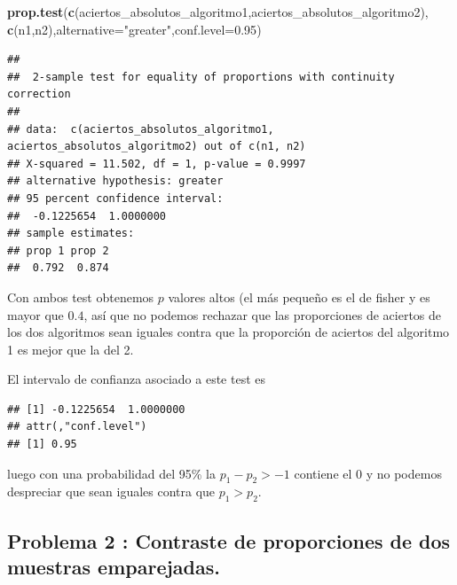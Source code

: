 \documentclass[
]{article}
\newenvironment{Shaded}{\begin{snugshade}}{\end{snugshade}}
\newcommand{\DataTypeTok}[1]{\textcolor[rgb]{0.13,0.29,0.53}{#1}}
\newcommand{\FloatTok}[1]{\textcolor[rgb]{0.00,0.00,0.81}{#1}}
\newcommand{\KeywordTok}[1]{\textcolor[rgb]{0.13,0.29,0.53}{\textbf{#1}}}
\newcommand{\NormalTok}[1]{#1}
\newcommand{\OperatorTok}[1]{\textcolor[rgb]{0.81,0.36,0.00}{\textbf{#1}}}
\newcommand{\StringTok}[1]{\textcolor[rgb]{0.31,0.60,0.02}{#1}}
\begin{document}
\begin{Shaded}
\begin{Highlighting}[]
\KeywordTok{prop.test}\NormalTok{(}\KeywordTok{c}\NormalTok{(aciertos_absolutos_algoritmo1,aciertos_absolutos_algoritmo2), }\KeywordTok{c}\NormalTok{(n1,n2),}\DataTypeTok{alternative=}\StringTok{"greater"}\NormalTok{,}\DataTypeTok{conf.level=}\FloatTok{0.95}\NormalTok{)}
\end{Highlighting}
\end{Shaded}

\begin{verbatim}
## 
##  2-sample test for equality of proportions with continuity correction
## 
## data:  c(aciertos_absolutos_algoritmo1, aciertos_absolutos_algoritmo2) out of c(n1, n2)
## X-squared = 11.502, df = 1, p-value = 0.9997
## alternative hypothesis: greater
## 95 percent confidence interval:
##  -0.1225654  1.0000000
## sample estimates:
## prop 1 prop 2 
##  0.792  0.874
\end{verbatim}

Con ambos test obtenemos \(p\) valores altos (el más pequeño es el de
fisher y es mayor que \(0.4\), así que no podemos rechazar que las
proporciones de aciertos de los dos algoritmos sean iguales contra que
la proporción de aciertos del algoritmo 1 es mejor que la del 2.

El intervalo de confianza asociado a este test es

\begin{Shaded}
\end{Shaded}

\begin{verbatim}
## [1] -0.1225654  1.0000000
## attr(,"conf.level")
## [1] 0.95
\end{verbatim}

luego con una probabilidad del 95\% la \(p_1-p_2> -1\) contiene el 0 y
no podemos despreciar que sean iguales contra que \(p_1>p_2.\)

\hypertarget{problema-2-contraste-de-proporciones-de-dos-muestras-emparejadas.}{%
\subsection{Problema 2 : Contraste de proporciones de dos muestras
emparejadas.}\label{problema-2-contraste-de-proporciones-de-dos-muestras-emparejadas.}}
\end{document}
